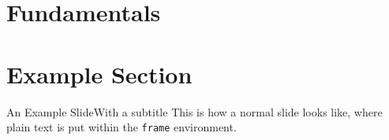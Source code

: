 
\section{Fundamentals} %
\begin{frame}
\end{frame}
\section{Example Section}
\begin{frame}[t]{An Example Slide}{With a subtitle}
	This is how a normal slide looks like, where plain text is put within the \texttt{frame} environment.
\end{frame}
%

